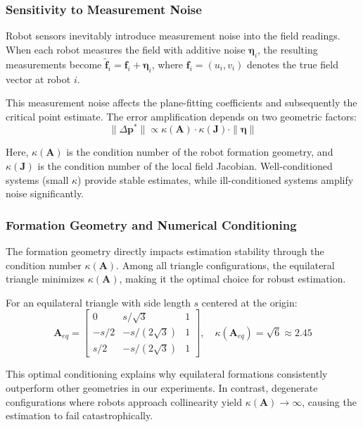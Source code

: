 \documentclass[lettersize,journal]{IEEEtran}
\begin{document}
\subsubsection{Sensitivity to Measurement Noise}

Robot sensors inevitably introduce measurement noise into the field readings. When each robot measures the field with additive noise $\boldsymbol{\eta}_i$, the resulting measurements become $\tilde{\mathbf{f}}_i = \mathbf{f}_i + \boldsymbol{\eta}_i$, where $\mathbf{f}_i = (u_i, v_i)$ denotes the true field vector at robot $i$.

This measurement noise affects the plane-fitting coefficients and subsequently the critical point estimate. The error amplification depends on two geometric factors:
\begin{equation}
\|\Delta\mathbf{p}^*\| \propto \kappa(\mathbf{A}) \cdot \kappa(\mathbf{J}) \cdot \|\boldsymbol{\eta}\|
\end{equation}

Here, $\kappa(\mathbf{A})$ is the condition number of the robot formation geometry, and $\kappa(\mathbf{J})$ is the condition number of the local field Jacobian. Well-conditioned systems (small $\kappa$) provide stable estimates, while ill-conditioned systems amplify noise significantly.

\subsubsection{Formation Geometry and Numerical Conditioning}

The formation geometry directly impacts estimation stability through the condition number $\kappa(\mathbf{A})$. Among all triangle configurations, the equilateral triangle minimizes $\kappa(\mathbf{A})$, making it the optimal choice for robust estimation.

For an equilateral triangle with side length $s$ centered at the origin:
\begin{equation}
\mathbf{A}_{eq} = \begin{bmatrix}
0 & s/\sqrt{3} & 1 \\
-s/2 & -s/(2\sqrt{3}) & 1 \\
s/2 & -s/(2\sqrt{3}) & 1
\end{bmatrix}, \quad \kappa(\mathbf{A}_{eq}) = \sqrt{6} \approx 2.45
\end{equation}

This optimal conditioning explains why equilateral formations consistently outperform other geometries in our experiments. In contrast, degenerate configurations where robots approach collinearity yield $\kappa(\mathbf{A}) \to \infty$, causing the estimation to fail catastrophically.
\end{document}
